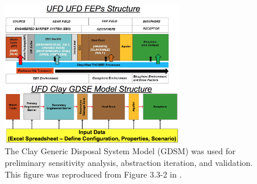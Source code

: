 \begin{figure}[htbp!]
  \begin{center}
    \includegraphics[width=0.7\textwidth]{./images/clay_gdsm.eps}
  \end{center}
  \caption{The Clay Generic Disposal System Model (GDSM) was used for 
  preliminary sensitivity analysis, abstraction iteration, and validation.
  This figure was reproduced from Figure 3.3-2 in \cite{clayton_generic_2011}.}
  \label{fig:clay_gdsm}
\end{figure}
